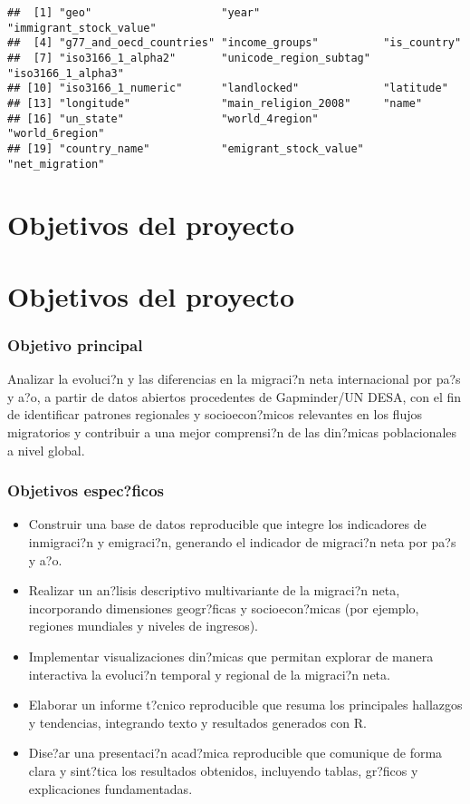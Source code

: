 \documentclass[
]{article}
\providecommand{\tightlist}{%
  \setlength{\itemsep}{0pt}\setlength{\parskip}{0pt}}
\begin{document}
\begin{verbatim}
##  [1] "geo"                    "year"                   "immigrant_stock_value" 
##  [4] "g77_and_oecd_countries" "income_groups"          "is_country"            
##  [7] "iso3166_1_alpha2"       "unicode_region_subtag"  "iso3166_1_alpha3"      
## [10] "iso3166_1_numeric"      "landlocked"             "latitude"              
## [13] "longitude"              "main_religion_2008"     "name"                  
## [16] "un_state"               "world_4region"          "world_6region"         
## [19] "country_name"           "emigrant_stock_value"   "net_migration"
\end{verbatim}

\section{Objetivos del proyecto}\label{objetivos-del-proyecto}

\section{Objetivos del proyecto}\label{objetivos-del-proyecto-1}

\subsubsection{Objetivo principal}\label{objetivo-principal}

Analizar la evoluci?n y las diferencias en la migraci?n neta
internacional por pa?s y a?o, a partir de datos abiertos procedentes de
Gapminder/UN DESA, con el fin de identificar patrones regionales y
socioecon?micos relevantes en los flujos migratorios y contribuir a una
mejor comprensi?n de las din?micas poblacionales a nivel global.

\subsubsection{Objetivos espec?ficos}\label{objetivos-especficos}

\begin{itemize}
\tightlist
\item
  Construir una base de datos reproducible que integre los indicadores
  de inmigraci?n y emigraci?n, generando el indicador de migraci?n neta
  por pa?s y a?o.
\item
  Realizar un an?lisis descriptivo multivariante de la migraci?n neta,
  incorporando dimensiones geogr?ficas y socioecon?micas (por ejemplo,
  regiones mundiales y niveles de ingresos).
\item
  Implementar visualizaciones din?micas que permitan explorar de manera
  interactiva la evoluci?n temporal y regional de la migraci?n neta.
\item
  Elaborar un informe t?cnico reproducible que resuma los principales
  hallazgos y tendencias, integrando texto y resultados generados con R.
\item
  Dise?ar una presentaci?n acad?mica reproducible que comunique de forma
  clara y sint?tica los resultados obtenidos, incluyendo tablas,
  gr?ficos y explicaciones fundamentadas.
\end{itemize}
\end{document}
